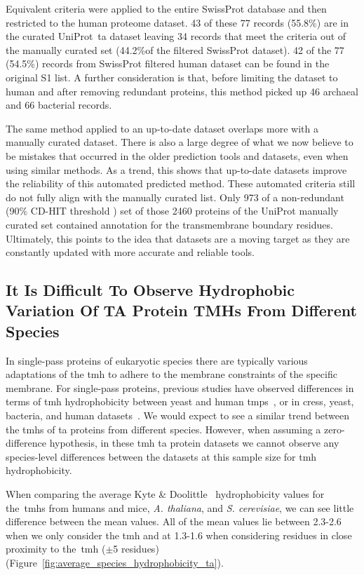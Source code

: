 Equivalent criteria were applied to the entire SwissProt database and then restricted to the human proteome dataset.
43 of these 77 records (55.8\%) are in the curated UniProt~\gls{ta}  dataset leaving 34 records that meet the criteria out of the manually curated set (44.2\%of the filtered SwissProt dataset).
42 of the 77 (54.5\%) records from SwissProt filtered human dataset can be found in the original S1 list.
A further consideration is that, before limiting the dataset to human and after removing redundant proteins, this method picked up  46 archaeal and 66 bacterial records.

The same method applied to an up-to-date dataset overlaps more with a manually curated dataset.
There is also a large degree of what we now believe to be mistakes that occurred in the older prediction tools and datasets, even when using similar methods.
As a trend, this shows that up-to-date datasets improve the reliability of this automated predicted method.
These automated criteria still do not fully align with the manually curated list.
Only 973 of a non-redundant (90\% CD-HIT threshold \cite{Huang2010, Wu2011}) set of those 2460 proteins of the UniProt manually curated set contained annotation for the transmembrane boundary residues.
Ultimately, this points to the idea that datasets are a moving target as they are constantly updated with more accurate and reliable tools.

\subsection{It Is Difficult To Observe Hydrophobic Variation Of TA Protein TMHs From Different Species}

In single-pass proteins of eukaryotic species there are typically various adaptations of the \gls{tmh} to adhere to the membrane constraints of the specific membrane.
For single-pass proteins, previous studies have observed differences in terms of \gls{tmh} hydrophobicity between yeast and human \gls{tmp}s~\cite{Sharpe2010}, or in cress, yeast, bacteria, and human datasets~\cite{Baker2017}.
We would expect to see a similar trend between the \gls{tmh}s of \gls{ta} proteins from different species.
However, when assuming a zero-difference hypothesis, in these \gls{tmh} \gls{ta} protein datasets we cannot observe any species-level differences between the datasets at this sample size for \gls{tmh} hydrophobicity.

When comparing the average Kyte \& Doolittle~\cite{Kyte1982} hydrophobicity values for the~\gls{tmh}s from humans and mice, \textit{A. thaliana}, and  \textit{S. cerevisiae}, we can see little difference between the mean values.
All of the mean values lie between 2.3-2.6 when we only consider the \gls{tmh} and at 1.3-1.6 when considering residues in close proximity to the~\gls{tmh} ($\pm$5 residues) (Figure~\ref{fig:average_species_hydrophobicity_ta}).

